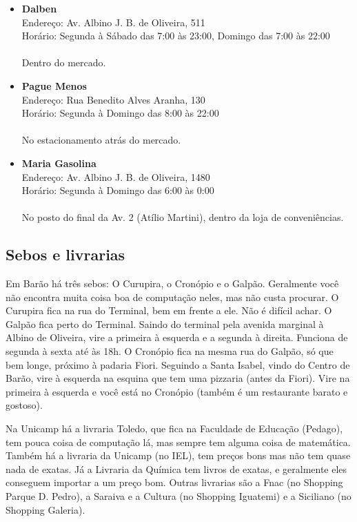 \begin{itemize}
\item \textbf{Dalben}
  \\Endereço: Av. Albino J. B. de Oliveira, 511
  \\Horário: Segunda à Sábado das 7:00 às 23:00, Domingo das 7:00 às 22:00
  \\
  \\Dentro do mercado.

\item \textbf{Pague Menos}
  \\Endereço: Rua Benedito Alves Aranha, 130
  \\Horário: Segunda à Domingo das 8:00 às 22:00
  \\
  \\No estacionamento atrás do mercado.

\item \textbf{Maria Gasolina}
  \\Endereço: Av. Albino J. B. de Oliveira, 1480
  \\Horário: Segunda à Domingo das 6:00 às 0:00
  \\
  \\No posto do final da Av. 2 (Atílio Martini), dentro da loja de 
  conveniências.

\end{itemize}

\subsection{Sebos e livrarias}

Em Barão há três sebos: O Curupira, o Cronópio e o Galpão. Geralmente você não
encontra muita coisa boa de computação neles, mas não custa procurar. O
Curupira fica na rua do Terminal, bem em frente a ele. Não é difícil achar. O
Galpão fica perto do Terminal. Saindo do terminal pela avenida marginal à
Albino de Oliveira, vire a primeira à esquerda e a segunda à direita. Funciona
de segunda à sexta até às 18h. O Cronópio fica na mesma rua do Galpão, só que
bem longe, próximo à padaria Fiori. Seguindo a Santa Isabel, vindo do Centro de
Barão, vire à esquerda na esquina que tem uma pizzaria (antes da Fiori). Vire
na primeira à esquerda e você está no Cronópio (também é um restaurante barato
e gostoso).

Na Unicamp há a livraria Toledo, que fica na Faculdade de Educação (Pedago),
tem pouca coisa de computação lá, mas sempre tem alguma coisa de matemática.
Também há a livraria da Unicamp (no IEL), tem preços bons mas não tem quase
nada de exatas. Já a Livraria da Química tem livros de exatas, e geralmente
eles conseguem importar a um preço bom. Outras livrarias são a Fnac (no
Shopping Parque D. Pedro), a Saraiva e a Cultura (no Shopping Iguatemi) e a
Siciliano (no Shopping Galeria).

